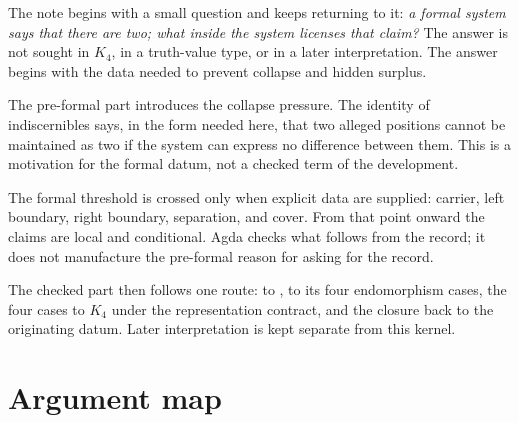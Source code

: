 \documentclass[11pt]{article}
\begin{document}
The note begins with a small question and keeps returning to it:
\emph{a formal system says that there are two; what inside the system
licenses that claim?}  The answer is not sought in $K_4$, in a
truth-value type, or in a later interpretation.  The answer begins with
the data needed to prevent collapse and hidden surplus.

The pre-formal part introduces the collapse pressure.  The identity of
indiscernibles says, in the form needed here, that two alleged positions
cannot be maintained as two if the system can express no difference
between them.  This is a motivation for the formal datum, not a checked
term of the development.

The formal threshold is crossed only when explicit data are supplied:
carrier, left boundary, right boundary, separation, and cover.  From
that point onward the claims are local and conditional.  Agda checks
what follows from the record; it does not manufacture the pre-formal
reason for asking for the record.

The checked part then follows one route:  to
,  to its four endomorphism cases,
the four cases to $K_4$ under the representation contract, and the
closure back to the originating  datum.  Later
interpretation is kept separate from this kernel.

\begin{center}
\end{center}

\section*{Argument map}
\end{document}
